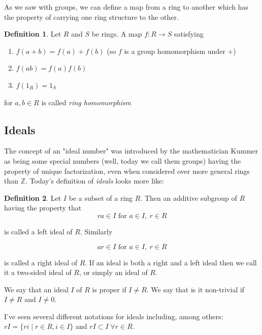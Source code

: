 \documentclass[11pt, oneside]{article}   	%
\theoremstyle{definition}
\newtheorem{definition}{Definition}[section]
\begin{document}
\bigskip
\noindent
As we saw with groups, we can define a map from a ring to another which has the property of carrying one ring structure to the other.

\bigskip
\begin{definition}
Let $R$ and $S$ be rings. A map $f : R \rightarrow S$  satisfying
\begin{enumerate}
\item $f(a + b) = f(a) + f(b)$  (so $f$ is a group homomorphism under +)
\item $f(ab) = f(a)f(b)$
\item $f(1_R) = 1_S$
\end{enumerate}
for $a, b \in R$ is called \emph{ring homomorphism}
\end{definition}

\subsection{Ideals}
The concept of an "ideal number" was introduced by the mathematician Kummer as being some special numbers (well, today we call them groups) having 
the property of unique factorization, even when considered over more general rings than $\mathbb{Z}$. Today's definition of \emph{ideals} looks more like:

\begin{definition}
Let $I$ be a subset of a ring $R$. Then an additive subgroup of $R$ having the property that
\begin{equation*}
ra \in I \text{ for }  a \in I, \: r \in R
\end{equation*}

\noindent
is called a left ideal of $R$.  Similarly

\begin{equation*}
ar \in I  \text{ for }  a \in I, \: r \in R
\end{equation*}

\noindent
is called a right ideal of $R$. If an ideal is both a right and a left ideal then we call it a two-sided ideal of $R$, or simply an ideal of $R$.
\end{definition}

\noindent
 We say that an ideal $I$ of $R$ is proper if $I \neq R$.  We say that is it non-trivial if $I \neq R$ and  $I \neq  0$.

\bigskip
\noindent
I've seen several different notations for ideals including, among others:  $rI = \{ri \mid r \in R, i \in I\}$ and 
$rI \subset I \;  \forall r \in R$. 
\end{document}

